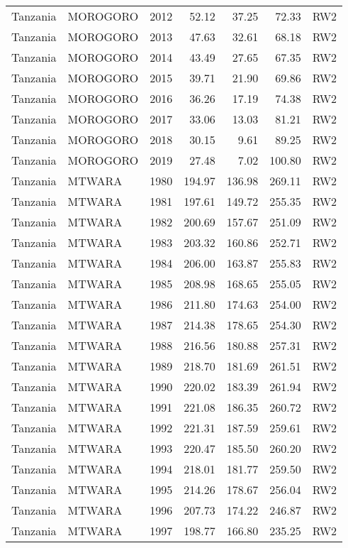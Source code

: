 \begin{longtable}{lllrrrl}
  Tanzania & MOROGORO & 2012 & 52.12 & 37.25 & 72.33 & RW2 \\ 
  Tanzania & MOROGORO & 2013 & 47.63 & 32.61 & 68.18 & RW2 \\ 
  Tanzania & MOROGORO & 2014 & 43.49 & 27.65 & 67.35 & RW2 \\ 
  Tanzania & MOROGORO & 2015 & 39.71 & 21.90 & 69.86 & RW2 \\ 
  Tanzania & MOROGORO & 2016 & 36.26 & 17.19 & 74.38 & RW2 \\ 
  Tanzania & MOROGORO & 2017 & 33.06 & 13.03 & 81.21 & RW2 \\ 
  Tanzania & MOROGORO & 2018 & 30.15 & 9.61 & 89.25 & RW2 \\ 
  Tanzania & MOROGORO & 2019 & 27.48 & 7.02 & 100.80 & RW2 \\ 
  Tanzania & MTWARA & 1980 & 194.97 & 136.98 & 269.11 & RW2 \\ 
  Tanzania & MTWARA & 1981 & 197.61 & 149.72 & 255.35 & RW2 \\ 
  Tanzania & MTWARA & 1982 & 200.69 & 157.67 & 251.09 & RW2 \\ 
  Tanzania & MTWARA & 1983 & 203.32 & 160.86 & 252.71 & RW2 \\ 
  Tanzania & MTWARA & 1984 & 206.00 & 163.87 & 255.83 & RW2 \\ 
  Tanzania & MTWARA & 1985 & 208.98 & 168.65 & 255.05 & RW2 \\ 
  Tanzania & MTWARA & 1986 & 211.80 & 174.63 & 254.00 & RW2 \\ 
  Tanzania & MTWARA & 1987 & 214.38 & 178.65 & 254.30 & RW2 \\ 
  Tanzania & MTWARA & 1988 & 216.56 & 180.88 & 257.31 & RW2 \\ 
  Tanzania & MTWARA & 1989 & 218.70 & 181.69 & 261.51 & RW2 \\ 
  Tanzania & MTWARA & 1990 & 220.02 & 183.39 & 261.94 & RW2 \\ 
  Tanzania & MTWARA & 1991 & 221.08 & 186.35 & 260.72 & RW2 \\ 
  Tanzania & MTWARA & 1992 & 221.31 & 187.59 & 259.61 & RW2 \\ 
  Tanzania & MTWARA & 1993 & 220.47 & 185.50 & 260.20 & RW2 \\ 
  Tanzania & MTWARA & 1994 & 218.01 & 181.77 & 259.50 & RW2 \\ 
  Tanzania & MTWARA & 1995 & 214.26 & 178.67 & 256.04 & RW2 \\ 
  Tanzania & MTWARA & 1996 & 207.73 & 174.22 & 246.87 & RW2 \\ 
  Tanzania & MTWARA & 1997 & 198.77 & 166.80 & 235.25 & RW2 \\ 

\end{longtable}
